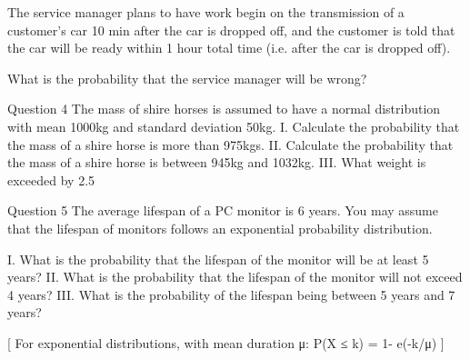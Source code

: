 The service manager plans to have work begin on the transmission of a customer’s car 10 min after the car is dropped off, and the customer is told that the car will be ready within 1 hour total time (i.e. after  the car is dropped off). 

What is the probability that the service manager will be wrong?

Question 4
 The mass of shire horses is assumed to have a normal distribution with mean 1000kg and standard deviation 50kg. 
I.	Calculate the probability that the mass of a shire horse is more than 975kgs.
II.	Calculate the probability that the mass of a shire horse is between 945kg and 1032kg.                    
III.	What weight is exceeded by 2.5%

Question 5
The average lifespan of a PC monitor is 6 years. You may assume that the lifespan
of monitors follows an exponential probability distribution.

I.	What is the probability that the lifespan of the monitor will be at least 5 years?
II.	What is the probability that the lifespan of the monitor will not exceed 4 years?
III.	What is the probability of the lifespan being between 5 years and 7 years?

[ For  exponential distributions, with mean duration μ:   P(X ≤ k) = 1- e(-k/μ) ]







